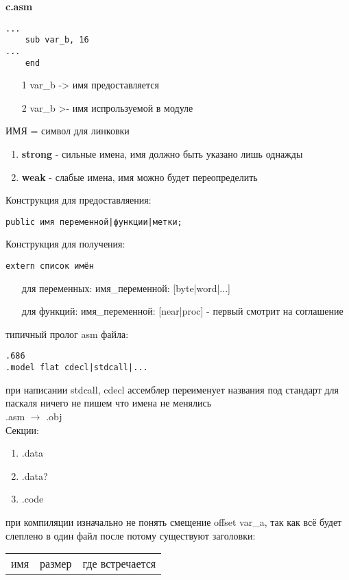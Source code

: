 \documentclass[a4paper, 12pt]{article}
\begin{document}
    \textbf{c.asm}
    \begin{lstlisting}
...
    sub var_b, 16
...
    end
    \end{lstlisting}
\begin{enumerate}
    \item[1] var\_b -> имя предоставляется
    \item[2] var\_b >- имя испрользуемой в модуле
\end{enumerate}
ИМЯ = символ для линковки
\begin{enumerate}
    \item \textbf{strong} - сильные имена, имя должно быть указано лишь однажды
    \item \textbf{weak} - слабые имена, имя можно будет переопределить
\end{enumerate}
Конструкция для предоставляения:
\begin{lstlisting}
public имя переменной|функции|метки;
\end{lstlisting}
Конструкция для получения:
\begin{lstlisting}
extern cписок имён
\end{lstlisting}
\begin{enumerate}
    \item[] для переменных: имя\_переменной: [byte|word|...]
    \item[] для функций: имя\_переменной: [near|proc] - первый смотрит на соглашение
\end{enumerate}
типичный пролог asm файла:
\begin{lstlisting}
.686
.model flat cdecl|stdcall|...
\end{lstlisting}
при написании stdcall, cdecl ассемблер переименует названия под стандарт для паскаля ничего не пишем что имена не менялись\\
.asm $\rightarrow$ .obj \\
Секции:
\begin{enumerate}
    \item .data
    \item .data?
    \item .code
\end{enumerate}
при компиляции изначально не понять смещение offset var\_a, так как всё будет слеплено в один файл после потому существуют заголовки:\\
\begin{tabular}{c|c|c}
    имя &
    размер &
    где встречается \\
\end{tabular}
\end{document}
